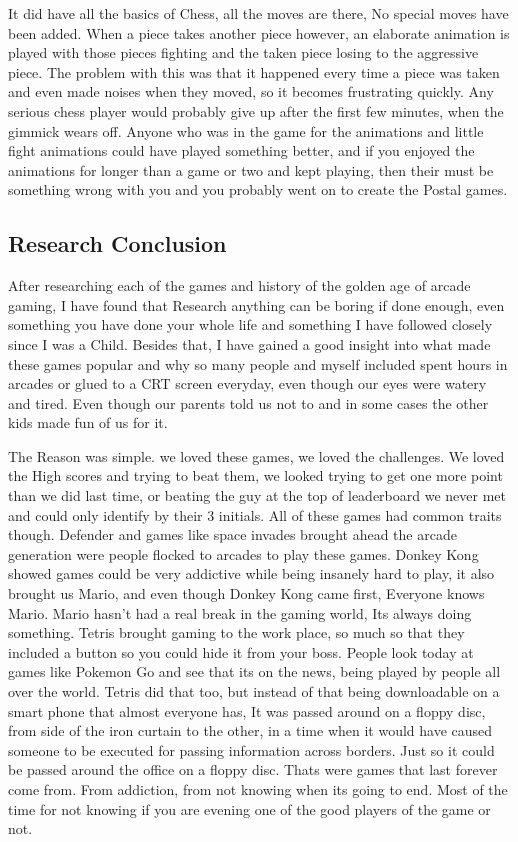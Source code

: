 \documentclass{article}
\begin{document}
It did have all the basics of Chess, all the moves are there, No special moves have been added. When a piece takes another piece however, an elaborate animation is played with those pieces fighting and the taken piece losing to the aggressive piece. The problem with this was that it happened every time a piece was taken and even made noises when they moved, so it becomes frustrating quickly. Any serious chess player would probably give up after the first few minutes, when the gimmick wears off. Anyone who was in the game for the animations and little fight animations could have played something better, and if you enjoyed the animations for longer than a game or two and kept playing, then their  must be something wrong with you and you probably went on to create the Postal games. \newline

\subsection{Research Conclusion}

After researching each of the games and history of the golden age of arcade gaming, I have found that Research anything can be boring if done enough, even something you have done your whole life and something I have followed closely since I was a Child. Besides that, I have gained a good insight into what made these games popular and why so many people and myself included spent hours in arcades or glued to a CRT screen everyday, even though our eyes were watery and tired. Even though our parents told us not to and in some cases the other kids made fun of us for it. \newline

The Reason was simple. we loved these games, we loved the challenges. We loved the High scores and trying to beat them, we looked trying to get one more point than we did last time, or beating the guy at the top of leaderboard we never met and could only identify by their 3 initials. All of these games had common traits though. Defender and games like space invades brought ahead the arcade generation were people flocked to arcades to play these games. Donkey Kong showed games could be very addictive while being insanely hard to play, it also brought us Mario, and even though Donkey Kong came first, Everyone knows Mario. Mario hasn't had a real break in the gaming world, Its always doing something. Tetris brought gaming to the work place, so much so that they included a button so you could hide it from your boss. People look today at games like Pokemon Go and see that its on the news, being played by people all over the world. Tetris did that too, but instead of that being downloadable on a smart phone that almost everyone has, It was passed around on a floppy disc, from side of the iron curtain to the other, in a time when it would have caused someone to be executed for passing information across borders. Just so it could be passed around the office on a floppy disc. Thats were games that last forever come from. From addiction, from not knowing when its going to end. Most of the  time for not knowing if you are evening one of the good players of the game or not. 
\clearpage
\end{document}
